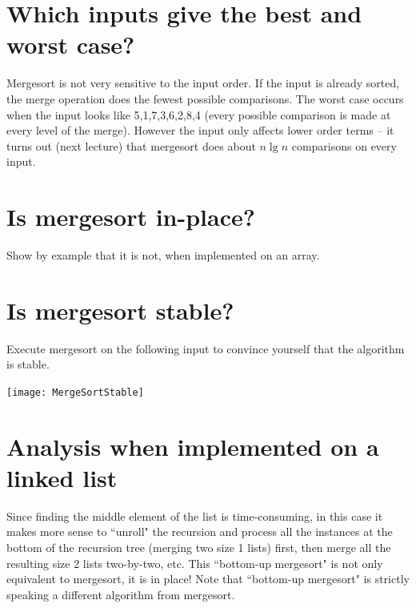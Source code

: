 \section{Which inputs give the best and worst case?}
Mergesort is not very sensitive to the input order. 
If the input is already sorted, the merge operation does the fewest possible comparisons. 
The worst case occurs when the input looks like 5,1,7,3,6,2,8,4 (every possible comparison is made at every level of the merge). 
However the input only affects lower order terms -- it turns out 
(next lecture)  that mergesort does about $n \lg n$ comparisons on every input.

\section{Is mergesort in-place?}
\begin{Boxample}[6]
Show by example that it is not, when implemented on an array.
\end{Boxample}

\section{Is mergesort stable?}

\begin{Boxample}[0]
Execute mergesort on the following input to convince yourself that the algorithm is stable.
\begin{center}
\texttt{[image: MergeSortStable]} 
\end{center} 
\end{Boxample}

\section{Analysis when implemented on a linked list}
Since finding the middle element of the list is time-consuming, in this case it makes more sense to ``unroll" the recursion 
and process all the instances at the bottom of the recursion tree (merging two size 1 lists) first, then merge all the resulting size 2 lists two-by-two, etc. 
This ``bottom-up mergesort" is not only equivalent to mergesort, it is in place! Note that ``bottom-up mergesort" is strictly speaking a different algorithm from mergesort.



